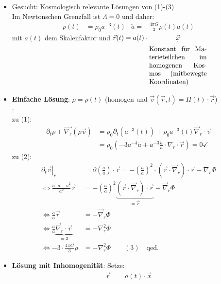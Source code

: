 \begin{itemize}
	\item Gesucht: Kosmologisch relevante Lösungen von (1)-(3)\\
		Im Newtonschen Grenzfall ist $\Lambda=0$ und daher:
		\begin{align*}
			\rho(t)&=\rho_0a^{-3}(t) & \ddot{a}=-\frac{4\pi G}{3}\rho(t)a(t)
		\end{align*}
		mit $a(t)$ dem Skalenfaktor und $\vec{r}(t)=a(t)\cdot\underset{\underset{\begin{minipage}{3cm}Konstant für Materieteilchen im homogenen Kosmos (mitbewegte Koordinaten)\end{minipage}}{\uparrow}}{\vec{x}}$
	\item \textbf{Einfache Lösung}: $\rho=\rho(t)$ (homogen und $\vec{v}(\vec{r},t)=H(t)\cdot\vec{r}$)\\
		\textbf{\underline{}}:\vspace{2mm}\\
		zu (1):
		\begin{align*}
			\partial_t\rho + \vec{\nabla_r}\left(\rho\vec{v}\right)&=\rho_0\partial_t\left(a^{-3}(t)\right)+\rho_0a^{-3}(t)\vec{\nabla}_r\cdot\vec{v}\\
			&=\rho_0\left(-3a^{-4}\dot{a}+a^{-3}\frac{\dot{a}}{a}\cdot\nabla_r\cdot\vec{r}\right)=0 \checkmark
		\end{align*}
		zu (2):
		\begin{align*}
			\left.\partial_t\vec{v}\right|_r&=\partial\left(\frac{\dot{a}}{a}\right)\cdot\vec{r}=-\left(\frac{\dot{a}}{a}\right)^2\cdot\left(\vec{r}\cdot\vec{\nabla}_r\right)\cdot\vec{r}-\nabla_r\Phi\\
			\Leftrightarrow \frac{\ddot{a}\cdot a-\dot{a}^2}{a^2}\vec{r}&=-\left(\frac{\dot{a}}{a}\right)^2\underset{=\vec{r}}{\underbrace{\left(\vec{r}\cdot\vec{\nabla}_r\right)\cdot\vec{r}}} -\vec{\nabla}_r\Phi\\
			\Leftrightarrow \frac{\ddot{a}}{a}\vec{r}&=-\vec{\nabla}_r\Phi\\
			\Leftrightarrow \frac{\ddot{a}}{a}\underset{=3}{\underbrace{\vec{\nabla}_r\cdot\vec{r}}}&=-\nabla_r^2\Phi\\
			\Leftrightarrow -3\cdot\frac{4\pi G}{3}\rho &= -\nabla_r^2\Phi \qquad (3) \quad \text{qed.}
		\end{align*}
	\item \textbf{Lösung mit Inhomogenität}: Setze:
		\begin{align*}
			\vec{r}&=a(t)\cdot\vec{x}\\

\end{align*}
\end{itemize}
